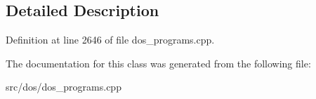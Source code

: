 \subsection{Detailed Description}


Definition at line 2646 of file dos\-\_\-programs.\-cpp.



The documentation for this class was generated from the following file\-:\begin{DoxyCompactItemize}
\item 
src/dos/dos\-\_\-programs.\-cpp\end{DoxyCompactItemize}
